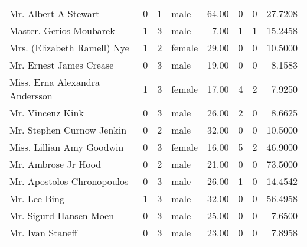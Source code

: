 \begin{tabular}{lrrlrrrr}
Mr. Albert A Stewart                               &         0 &       1 &    male &  64.00 &                        0 &                        0 &   27.7208 \\
Master. Gerios Moubarek                            &         1 &       3 &    male &   7.00 &                        1 &                        1 &   15.2458 \\
Mrs. (Elizabeth Ramell) Nye                        &         1 &       2 &  female &  29.00 &                        0 &                        0 &   10.5000 \\
Mr. Ernest James Crease                            &         0 &       3 &    male &  19.00 &                        0 &                        0 &    8.1583 \\
Miss. Erna Alexandra Andersson                     &         1 &       3 &  female &  17.00 &                        4 &                        2 &    7.9250 \\
Mr. Vincenz Kink                                   &         0 &       3 &    male &  26.00 &                        2 &                        0 &    8.6625 \\
Mr. Stephen Curnow Jenkin                          &         0 &       2 &    male &  32.00 &                        0 &                        0 &   10.5000 \\
Miss. Lillian Amy Goodwin                          &         0 &       3 &  female &  16.00 &                        5 &                        2 &   46.9000 \\
Mr. Ambrose Jr Hood                                &         0 &       2 &    male &  21.00 &                        0 &                        0 &   73.5000 \\
Mr. Apostolos Chronopoulos                         &         0 &       3 &    male &  26.00 &                        1 &                        0 &   14.4542 \\
Mr. Lee Bing                                       &         1 &       3 &    male &  32.00 &                        0 &                        0 &   56.4958 \\
Mr. Sigurd Hansen Moen                             &         0 &       3 &    male &  25.00 &                        0 &                        0 &    7.6500 \\
Mr. Ivan Staneff                                   &         0 &       3 &    male &  23.00 &                        0 &                        0 &    7.8958 \\

\end{tabular}
